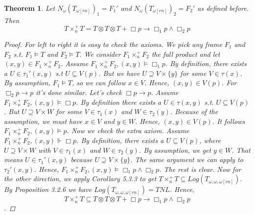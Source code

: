 \documentclass[12pt, a4paper]{scrartcl}
\newtheorem{theorem}[definition]{Theorem}
\begin{document}
    \begin{theorem}
        Let $N_\omega(T_{\omega[rn]})_1 = F_1'$ and $N_\omega(T_{\omega[rn]})_2 = F_2'$ as defined before. Then 
        $$T \times^+_n T = T \otimes T \otimes T + \Box p \rightarrow \Box_1 p \land \Box_2 p$$

        \begin{proof}
            For left to right it is easy to check the axioms. We pick any frame $F_1$ and $F_2$ s.t.
            $F_1 \vDash T$ and $F_2 \vDash T$. We consider $F_1 \times^+_n F_2$ the full product and let $(x,y) \in F_1 \times^+_n F_2$. \newline
            Assume $F_1 \times^+_n F_2,(x,y) \vDash \Box_1 p$. By definition, there exists a $U \in \tau_1'(x,y)$ s.t $U \subseteq V(p)$.
            But we have $U \supseteq V \times \{y\}$ for some $V \in \tau(x)$. By assumption, $F_1 \vDash T$, so we can follow $x \in V$. Hence, $(x,y) \in V(p)$. For $\Box_2p \rightarrow p$ it's done similar. \newline Let's check $\Box p \rightarrow p$.
            Assume $F_1 \times^+_n F_2,(x,y) \vDash \Box p$. By definition there exists a $U \in \tau(x,y)$ s.t. $U \subseteq V(p)$. But $U \supseteq V \times W$ for some $V \in \tau_1(x)$ and $W \in \tau_2(y)$.
            Because of the assumption, we must have $x \in V$ and $y \in W$. Hence, $(x,y) \in V(p)$. It follows $F_1 \times^+_n F_2,(x,y) \vDash p$. \newline
            Now we check the extra axiom.  Assume $F_1 \times^+_n F_2,(x,y) \Vdash \Box p$. By definition, there exists a $U \subseteq V(p)$, where $U \supseteq V \times W$ with $V \in \tau_1(x)$ and $W \in \tau_2(y)$. By assumption, we get $y \in W$. That means $U \in \tau_1'(x,y)$ 
            because $U \supseteq V \times \{y\}$. The same argument we can apply to $\tau_2'(x,y)$. Hence, $F_1 \times^+_n F_2,(x,y) \vDash \Box_1 p \land \Box_2 p$. The rest is clear. \newline
            Now for the other direction, we apply Corollary 5.3.3 to get $T \times^+_n T \subseteq Log(T_{\omega,\omega,\omega[rn]})$. By Proposition 3.2.6 we have
            $Log(T_{\omega,\omega,\omega[rn]}) = TNL$. Hence, 
            $$T \times^+_n T \subseteq T \otimes T \otimes T + \Box p \rightarrow \Box_1 p \land \Box_2 p$$.
            

        \end{proof}
        
    \end{theorem}


    
\end{document}
